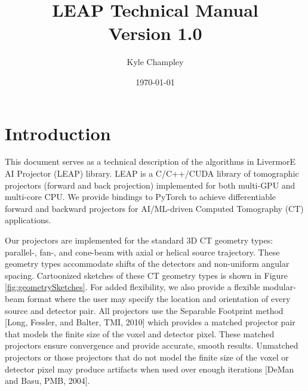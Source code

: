 \documentclass[11pt]{article}
\title{LEAP Technical Manual \\ Version 1.0}
\author{Kyle Champley}
\date{\today}
\begin{document}
\newcommand{\B}[1]{\textbf{#1}}
\newcommand{\ra}{\rightarrow}
\newcommand{\sinc}{\text{sinc}}
\newcommand{\supp}{\text{supp}}
\newcommand{\suppe}{\text{supp}_{\varepsilon}}
\newcommand{\ind}{\B{1}}
\newcommand{\sgn}{\text{sgn}}
\newcommand{\etal}{\text{et al. }}
\newcommand{\Beta}{{\boldsymbol\beta}}
\newcommand{\Radon}{\mathcal{R}}
\newcommand{\Xray}{\mathcal{P}}
\newcommand{\Fourier}{\mathcal{F}}
\newcommand{\Hilbert}{\mathcal{H}}
\newcommand{\Identity}{\mathcal{I}}
\newcommand{\BL}{\mathcal{L}}
\newcommand{\R}{\mathcal{R}}
\newcommand{\Cov}{\text{Cov}}
\newcommand{\argmin}{\operatorname{argmin}}

\maketitle



\section{Introduction}

This document serves as a technical description of the algorithms in LivermorE AI Projector (LEAP) library.  LEAP is a C/C++/CUDA library of tomographic projectors (forward and back projection) implemented for both multi-GPU and multi-core CPU. We provide bindings to PyTorch to achieve differentiable forward and backward projectors for AI/ML-driven Computed Tomography (CT) applications.

Our projectors are implemented for the standard 3D CT geometry types: parallel-, fan-, and cone-beam with axial or helical source trajectory. These geometry types accommodate shifts of the detectors and non-uniform angular spacing. Cartoonized sketches of these CT geometry types is shown in Figure \ref{fig:geometrySketches}. For added flexibility, we also provide a flexible modular-beam format where the user may specify the location and orientation of every source and detector pair. All projectors use the Separable Footprint method [Long, Fessler, and Balter, TMI, 2010] which provides a matched projector pair that models the finite size of the voxel and detector pixel. These matched projectors ensure convergence and provide accurate, smooth results. Unmatched projectors or those projectors that do not model the finite size of the voxel or detector pixel may produce artifacts when used over enough iterations [DeMan and Basu, PMB, 2004].
\end{document}
